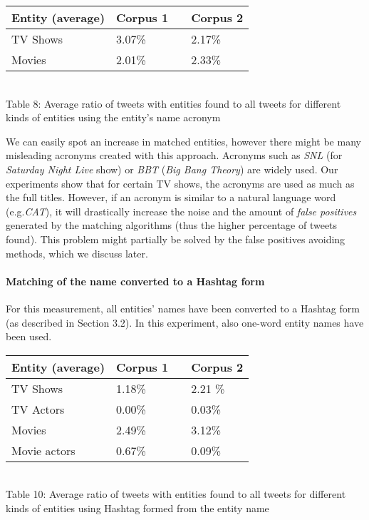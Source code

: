 \begin{center}
  \begin{tabular}{ | p{4cm} | p{2cm} | p{1cm}| p{2cm} | } \hline
    Entity (average) & Corpus 1 & & Corpus 2 \\ \hline
    TV Shows & 3.07\% & & 2.17\% \\ \hline
    Movies & 2.01\% & & 2.33\% \\ \hline
  \end{tabular} \\
  Table 8: Average ratio of tweets with entities found to all tweets for different kinds of entities using the entity's name acronym \\
\end{center}

We can easily spot an increase in matched entities, however there might be many
misleading acronyms created with this approach. Acronyms such as \textit{SNL}
(for \textit{Saturday Night Live} show) or  \textit{BBT} (\textit{Big Bang
Theory}) are widely used. Our experiments show that for certain TV shows, the acronyms
are used as much as the full titles. However,
if an acronym is similar to a natural language word (e.g.\textit{CAT}),
it will drastically increase the noise and the amount of \textit{false positives} generated by the
matching algorithms (thus the higher percentage of tweets found). This problem might
partially be solved by the false positives avoiding methods, which we discuss later.

\paragraph{Matching of the name converted to a Hashtag form}
For this measurement, all entities' names have been converted to a Hashtag form (as described
in Section 3.2). In this experiment, also one-word entity names have been used.

\begin{center}
  \begin{tabular}{ | p{4cm} | p{2cm} | p{1cm}| p{2cm} | } \hline
    Entity (average) & Corpus 1 & & Corpus 2 \\ \hline
    TV Shows & 1.18\% & & 2.21 \% \\ \hline
    TV Actors & 0.00\% & & 0.03\% \\ \hline
    Movies & 2.49\% & & 3.12\% \\ \hline
    Movie actors & 0.67\% & & 0.09\% \\ \hline
  \end{tabular} \\
  Table 10: Average ratio of tweets with entities found to all tweets for different kinds of entities using Hashtag formed from the entity name \\
\end{center}

